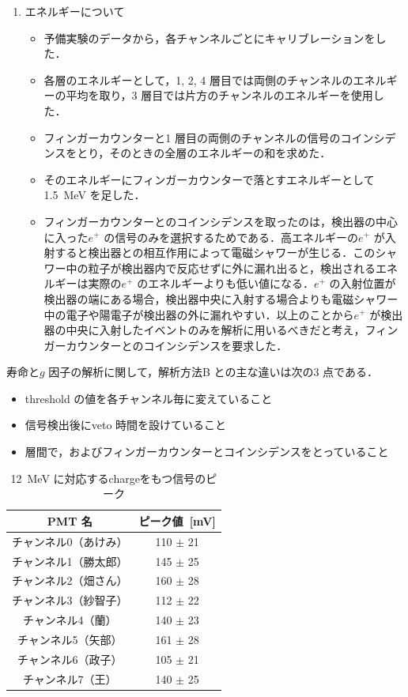 \begin{enumerate}
\begin{itemize}
\end{itemize}
\item エネルギーについて
\begin{itemize}
\item 予備実験のデータから，各チャンネルごとにキャリブレーションをした．
\item 各層のエネルギーとして，1, 2, 4 層目では両側のチャンネルのエネルギーの平均を取り，3 層目では片方のチャンネルのエネルギーを使用した．
\item フィンガーカウンターと1 層目の両側のチャンネルの信号のコインシデンスをとり，そのときの全層のエネルギーの和を求めた．
\item そのエネルギーにフィンガーカウンターで落とすエネルギーとして1.5~MeV を足した．
\item フィンガーカウンターとのコインシデンスを取ったのは，検出器の中心に入った$e^{+}$ の信号のみを選択するためである．高エネルギーの$e^{+}$ が入射すると検出器との相互作用によって電磁シャワーが生じる．このシャワー中の粒子が検出器内で反応せずに外に漏れ出ると，検出されるエネルギーは実際の$e^{+}$ のエネルギーよりも低い値になる．$e^{+}$ の入射位置が検出器の端にある場合，検出器中央に入射する場合よりも電磁シャワー中の電子や陽電子が検出器の外に漏れやすい．以上のことから$e^{+}$ が検出器の中央に入射したイベントのみを解析に用いるべきだと考え，フィンガーカウンターとのコインシデンスを要求した．
\end{itemize}
\end{enumerate}

寿命と$g$ 因子の解析に関して，解析方法B との主な違いは次の3 点である．
\begin{itemize}
\item threshold の値を各チャンネル毎に変えていること
\item 信号検出後にveto 時間を設けていること
\item 層間で，およびフィンガーカウンターとコインシデンスをとっていること
\end{itemize}
  
\begin{table}[h]
\caption{12~MeV に対応するchargeをもつ信号のピーク}
\label{12MeVpeak}
\centering
\begin{tabular}{cc}\toprule
PMT 名&ピーク値~[mV] \\ \hline
チャンネル0（あけみ） & 110 $\pm$ 21 \\
チャンネル1（勝太郎） & 145 $\pm$ 25 \\
チャンネル2（畑さん） & 160 $\pm$ 28 \\
チャンネル3（紗智子） & 112 $\pm$ 22 \\
チャンネル4（蘭） & 140 $\pm$ 23 \\
チャンネル5（矢部） & 161 $\pm$ 28 \\
チャンネル6（政子） & 105 $\pm$ 21 \\
チャンネル7（王） & 140 $\pm$ 25 \\ \bottomrule
\end{tabular}
\end{table}

